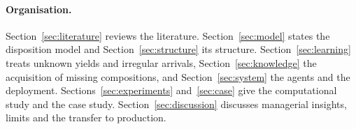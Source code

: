 \paragraph{Organisation.} Section~\ref{sec:literature} reviews the literature. Section~\ref{sec:model} states the
disposition model and Section~\ref{sec:structure} its structure. Section~\ref{sec:learning} treats unknown yields and
irregular arrivals, Section~\ref{sec:knowledge} the acquisition of missing compositions, and Section~\ref{sec:system}
the agents and the deployment. Sections~\ref{sec:experiments} and~\ref{sec:case} give the computational study and
the case study. Section~\ref{sec:discussion} discusses managerial insights, limits and the transfer to production.
